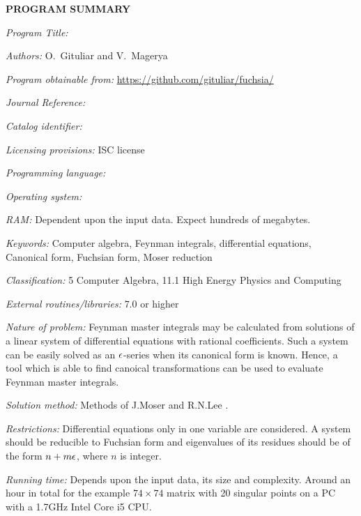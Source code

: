 {\bf PROGRAM SUMMARY}

\begin{small}
\noindent

{\em Program Title:}
    \fuchsia{}

{\em Authors:}
    O.~Gituliar and V.~Magerya

{\em Program obtainable from:}
    \url{https://github.com/gituliar/fuchsia/}

{\em Journal Reference:}

{\em Catalog identifier:}

{\em Licensing provisions:}
    ISC license

{\em Programming language:}

{\em Operating system:}
    \linux

{\em RAM:}
    Dependent upon the input data. Expect hundreds of megabytes.

{\em Keywords:}
    Computer algebra, Feynman integrals, differential equations, Canonical form, Fuchsian form, Moser reduction

{\em Classification:}
    5 Computer Algebra, 11.1 High Energy Physics and Computing

{\em External routines/libraries:}
    \href{http://www.sagemath.org/}{\sage} 7.0 or higher

{\em Nature of problem:}
    Feynman master integrals may be calculated from solutions of a linear system of differential equations with rational coefficients.
    Such a system can be easily solved as an $\epsilon$-series when its canonical form is known.
    Hence, a tool which is able to find canoical transformations can be used to evaluate Feynman master integrals. 

{\em Solution method:}
    Methods of J.Moser \cite{Mos59} and R.N.Lee \cite{Lee15}.

{\em Restrictions:}
    Differential equations only in one variable are considered.
    A system should be reducible to Fuchsian form and eigenvalues of its residues should be of the form $n + m \epsilon$, where $n$ is integer.

{\em Running time:}
    Depends upon the input data, its size and complexity.
    Around an hour in total for the example $74\times74$ matrix with 20 singular points on a PC with a 1.7GHz Intel Core i5 CPU.

\end{small}
